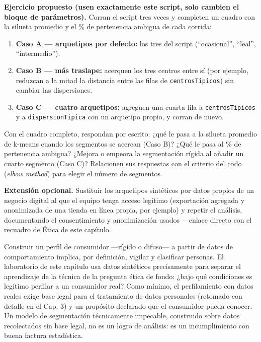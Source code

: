 \begin{cajaLaboratorio}
\textbf{Ejercicio propuesto (usen exactamente este script, solo cambien el
bloque de parámetros).} Corran el script tres veces y completen un cuadro
con la silueta promedio y el \% de pertenencia ambigua de cada corrida:
\begin{enumerate}
  \item \textbf{Caso A — arquetipos por defecto:} los tres del script
  (\enquote{ocasional}, \enquote{leal}, \enquote{intermedio}).
  \item \textbf{Caso B — más traslape:} acerquen los tres centros entre sí
  (por ejemplo, reduzcan a la mitad la distancia entre las filas de
  \texttt{centrosTipicos}) sin cambiar las dispersiones.
  \item \textbf{Caso C — cuatro arquetipos:} agreguen una cuarta fila a
  \texttt{centrosTipicos} y a \texttt{dispersionTipica} con un arquetipo
  propio, y corran de nuevo.
\end{enumerate}
Con el cuadro completo, respondan por escrito: ¿qué le pasa a la silueta
promedio de k-means cuando los segmentos se acercan (Caso B)? ¿Qué le pasa
al \% de pertenencia ambigua? ¿Mejora o empeora la segmentación rígida al
añadir un cuarto segmento (Caso C)? Relacionen sus respuestas con el
criterio del codo (\textit{elbow method}) para elegir el número de
segmentos.

\textbf{Extensión opcional.} Sustituir los arquetipos sintéticos por datos
propios de un negocio digital al que el equipo tenga acceso legítimo
(exportación agregada y anonimizada de una tienda en línea propia, por
ejemplo) y repetir el análisis, documentando el consentimiento y anonimización
usados —enlace directo con el recuadro de Ética de este capítulo.
\end{cajaLaboratorio}

\begin{cajaEtica}
Construir un perfil de consumidor —rígido o difuso— a partir de datos de
comportamiento implica, por definición, vigilar y clasificar personas. El
laboratorio de este capítulo usa datos sintéticos precisamente para separar
el aprendizaje de la técnica de la pregunta ética de fondo: ¿bajo qué
condiciones es legítimo perfilar a un consumidor real? Como mínimo, el
perfilamiento con datos reales exige base legal para el tratamiento de
datos personales (retomado con detalle en el Cap. 3) y un propósito
declarado que el consumidor pueda conocer. Un modelo de segmentación
técnicamente impecable, construido sobre datos recolectados sin base legal,
no es un logro de análisis: es un incumplimiento con buena factura
estadística.
\end{cajaEtica}

